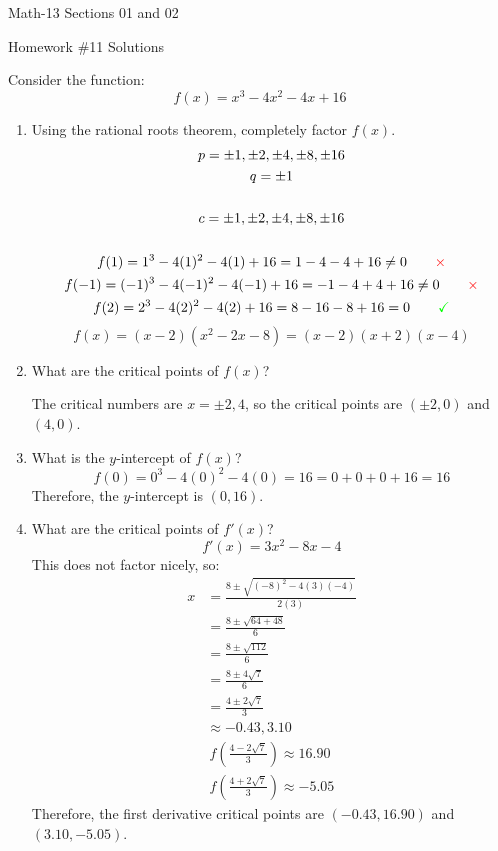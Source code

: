 \documentclass[letterpaper,12pt,fleqn]{article}
\newcommand{\no}{\textcolor{red}{\times}}
\newcommand{\yes}{\textcolor{green}{\checkmark}}
\begin{document}
\begin{center}
  \large
  Math-13 Sections 01 and 02

  \Large
  Homework \#11 Solutions
\end{center}

\vspace{0.5in}

Consider the function:
\[f(x)=x^3-4x^2-4x+16\]
\begin{enumerate}
\item Using the rational roots theorem, completely factor \(f(x)\).
  \begin{gather*}
    p=\pm1,\pm2,\pm4,\pm8,\pm16 \\
    q=\pm1 \\
    \\
    c=\pm1,\pm2,\pm4,\pm8,\pm16 \\
    \\
    f(1)=1^3-4(1)^2-4(1)+16=1-4-4+16\ne0\qquad\no \\
    f(-1)=(-1)^3-4(-1)^2-4(-1)+16=-1-4+4+16\ne0\qquad\no \\
    f(2)=2^3-4(2)^2-4(2)+16=8-16-8+16=0\qquad\yes \\
  \end{gather*}
  \[f(x)=(x-2)(x^2-2x-8)=(x-2)(x+2)(x-4)\]
\item What are the critical points of \(f(x)\)?

  The critical numbers are \(x=\pm2,4\), so the critical points are \((\pm2,0)\) and \((4,0)\).

\item What is the \(y\)-intercept of \(f(x)\)?
  \[f(0)=0^3-4(0)^2-4(0)=16=0+0+0+16=16\]
  Therefore, the \(y\)-intercept is \((0,16)\).
  
\item What are the critical points of \(f'(x)\)?
  \[f'(x)=3x^2-8x-4\]
  This does not factor nicely, so:
  \begin{align*}
    x &= \frac{8\pm\sqrt{(-8)^2-4(3)(-4)}}{2(3)} \\
    &= \frac{8\pm\sqrt{64+48}}{6} \\
    &= \frac{8\pm\sqrt{112}}{6} \\
    &= \frac{8\pm4\sqrt{7}}{6} \\
    &= \frac{4\pm2\sqrt{7}}{3} \\
    &\approx -0.43,3.10
  \end{align*}
  \begin{gather*}
    f\left(\frac{4-2\sqrt{7}}{3}\right)\approx16.90 \\
    f\left(\frac{4+2\sqrt{7}}{3}\right)\approx-5.05
  \end{gather*}
  Therefore, the first derivative critical points are \((-0.43,16.90)\) and \((3.10,-5.05)\).


\end{enumerate}
\end{document}
